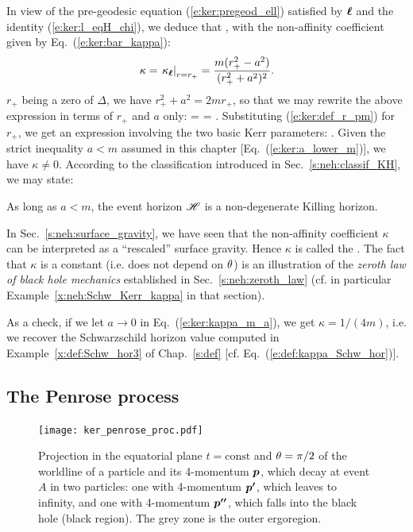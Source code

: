 In view of the pre-geodesic equation (\ref{e:ker:pregeod_ell}) satisfied
by $\bm{\ell}$ and the identity (\ref{e:ker:l_eqH_chi}), we deduce that
\be \label{e:ker:pregeod_chi}
    \encadre{ \wnab_{\w{\chi}}\, \w{\chi} \equalH \kappa \, \w{\chi} },
\ee
with the non-affinity coefficient given by Eq.~(\ref{e:ker:bar_kappa}):
\[
    \kappa = \left. \kappa_{\bm{\ell}} \right| _{r=r_+} = \frac{m(r_+^2-a^2)}{(r_+^2+a^2)^2} .
\]
$r_+$ being a zero of $\Delta$, we have $r_+^2 + a^2 = 2 m r_+$, so that we may
rewrite the above expression in terms of $r_+$ and $a$ only:
\be \label{e:ker:kappa_rp_m_a}
    \kappa =  =  .
\ee
Substituting (\ref{e:ker:def_r_pm}) for $r_+$, we get an expression involving
the two basic Kerr parameters:
\be \label{e:ker:kappa_m_a}
     .
\ee
Given the strict inequality $a<m$ assumed in this chapter [Eq.~(\ref{e:ker:a_lower_m})],
we have $\kappa\not=0$. According to the classification introduced in
Sec.~\ref{s:neh:classif_KH}, we may state:
\begin{prop}
As long as $a<m$, the event horizon $\mathscr{H}$ is a non-degenerate Killing horizon.
\end{prop}
In Sec.~\ref{s:neh:surface_gravity}, we have seen that the non-affinity coefficient
$\kappa$ can be interpreted as a ``rescaled'' surface gravity. Hence $\kappa$
is called
the .
The fact that $\kappa$ is a constant (i.e. does not depend on $\theta$) is
an illustration of the \emph{zeroth law of black hole mechanics}
established in Sec.~\ref{s:neh:zeroth_law} (cf. in particular
Example~\ref{x:neh:Schw_Kerr_kappa} in that section).
\begin{remark}
As a check, if we let $a\rightarrow 0$ in Eq.~(\ref{e:ker:kappa_m_a}), we get
$\kappa = 1/(4m)$, i.e. we recover the Schwarzschild horizon value computed in
Example~\ref{x:def:Schw_hor3} of Chap.~\ref{s:def} [cf. Eq.~(\ref{e:def:kappa_Schw_hor})].
\end{remark}

\subsection{The Penrose process} \label{s:ker:Penrose_proc}

\begin{figure}
\centerline{\texttt{[image: ker\_penrose\_proc.pdf]}}
\caption[]{\label{f:ker:penrose_proc} \footnotesize
Projection in the equatorial plane $t=\mathrm{const}$
and $\theta=\pi/2$ of the worldline of a particle and its 4-momentum $\bm{p}$,
which decay at event $A$ in two particles: one with 4-momentum
$\bm{p'}$, which leaves to infinity, and one with 4-momentum
$\bm{p''}$, which falls into the black hole (black region).
The grey zone is the outer ergoregion.
}
\end{figure}

